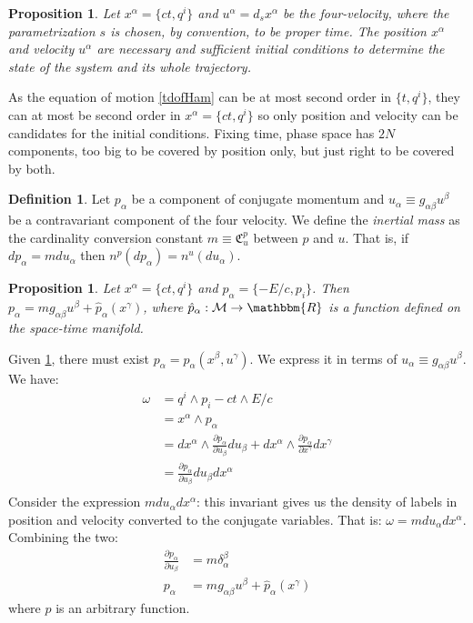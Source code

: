 \documentclass[aps,pra,10pt,twocolumn,floatfix,nofootinbib]{revtex4-1}
\newtheorem{prop}[thm]{Proposition}
\theoremstyle{definition}
\newtheorem{defn}[thm]{Definition}
\begin{document}
\begin{prop}\label{initialConditions}
Let $x^\alpha=\{ct, q^i\}$ and $u^\alpha = d_s x^\alpha$ be the four-velocity, where the parametrization $s$ is chosen, by convention, to be proper time. The position $x^\alpha$ and velocity $u^\alpha$ are necessary and sufficient initial conditions to determine the state of the system and its whole trajectory.
\end{prop}

As the equation of motion \ref{tdofHam} can be at most second order in $\{t, q^i\}$, they can at most be second order in $x^\alpha=\{ct, q^i\}$ so only position and velocity can be candidates for the initial conditions. Fixing time, phase space has $2N$ components, too big to be covered by position only, but just right to be covered by both.

\begin{defn}\label{inertialMass}
Let $p_\alpha$ be a component of conjugate momentum and $u_\alpha \equiv g_{\alpha \beta}u^\beta$ be a contravariant component of the four velocity. We define the \emph{inertial mass} as the cardinality conversion constant $m \equiv \mathfrak{C}^p_u$ between $p$ and $u$. That is, if $dp_\alpha=mdu_\alpha$ then $n^p(dp_\alpha)=n^u(du_\alpha)$.
\end{defn}

\begin{prop}\label{kineticMomentum}
Let $x^\alpha=\{ct, q^i\}$ and $p_\alpha=\{-E/c, p_i\}$. Then $p_\alpha= m g_{\alpha \beta}u^\beta + \hat{p}_\alpha(x^\gamma)$, where $\hat{p}_\alpha : \mathcal{M} \rightarrow \mathbbm{R}$ is a function defined on the space-time manifold.
\end{prop}

Given \ref{initialConditions}, there must exist $p_\alpha=p_\alpha(x^\beta , u^\gamma)$. We express it in terms of $u_\alpha\equiv g_{\alpha \beta} u^\beta$. We have:
\begin{align*}
\omega &= q^i\wedge p_i - ct \wedge E/c \\
&=x^\alpha \wedge p_\alpha \\
&=dx^\alpha \wedge \frac{\partial p_\alpha}{\partial u_\beta}du_\beta + dx^\alpha \wedge \frac{\partial p_\alpha}{\partial x^\gamma}dx^\gamma \\
&=\frac{\partial p_\alpha}{\partial u_\beta}du_\beta dx^\alpha \\
\end{align*}
Consider the expression $m du_\alpha dx^\alpha$: this invariant gives us the density of labels in position and velocity converted to the conjugate variables. That is: $\omega=m du_\alpha dx^\alpha$. Combining the two:
\begin{align*}
\frac{\partial p_\alpha}{\partial u_\beta} &= m \delta^\beta_\alpha \\
p_\alpha &= m g_{\alpha \beta}u^\beta + \hat{p}_\alpha(x^\gamma)
\end{align*}
where $\hat{p}$ is an arbitrary function.
\end{document}
